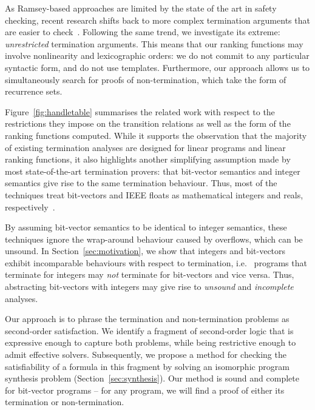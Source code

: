 \documentclass[preprint]{sigplanconf}
\theoremstyle{definition}
\begin{document}
As Ramsey-based approaches are limited by the state of the art in safety
checking, recent research shifts back to more complex termination arguments
that are easier to
check~\cite{DBLP:conf/cav/KroeningSTW10,DBLP:conf/tacas/CookSZ13}. 
Following the same trend, we investigate its extreme: \emph{unrestricted}
termination arguments.  This means that our ranking functions may involve
nonlinearity and lexicographic orders: we do not commit to any particular
syntactic form, and do not use templates.  Furthermore, our approach allows
us to simultaneously search for proofs of non-termination, which take the form
of recurrence sets.

Figure~\ref{fig:handletable} summarises the related work with respect to the
restrictions they impose on the transition relations as well as the form of
the ranking functions computed.  While it supports the observation that the
majority of existing termination analyses are designed for linear programs
and linear ranking functions, it also highlights another simplifying
assumption made by most state-of-the-art termination provers: that
bit-vector semantics and integer semantics give rise to the same termination
behaviour.  Thus, most of the techniques treat bit-vectors and IEEE floats
as mathematical integers and reals,
respectively~\cite{DBLP:conf/pldi/CookPR06,DBLP:conf/popl/Ben-AmramG13,DBLP:conf/vmcai/P04,DBLP:conf/atva/HeizmannHLP13,DBLP:conf/vmcai/BradleyMS05,DBLP:conf/cav/KroeningSTW10}.

By assuming bit-vector semantics to be identical to integer semantics, these
techniques ignore the wrap-around behaviour caused by overflows, which can
be unsound.  In Section~\ref{sec:motivation}, we show that integers and
bit-vectors exhibit incomparable behaviours with respect to termination,
i.e.~ programs that terminate for integers may \emph{not} terminate for
bit-vectors and vice versa.  Thus, abstracting bit-vectors with integers may
give rise to {\em unsound} and {\em incomplete} analyses.



Our approach is to phrase the termination and non-termination problems as
second-order satisfaction.  We identify a fragment of second-order
logic that is expressive enough to capture both problems, while being
restrictive enough to admit effective solvers.  Subsequently, we propose a method for
checking the satisfiability of a formula in this fragment by
solving an isomorphic program synthesis problem
(Section~\ref{sec:synthesis}).  Our method is sound and
complete for bit-vector programs -- for any program, we will find
a proof of either its termination or non-termination.
\end{document}
